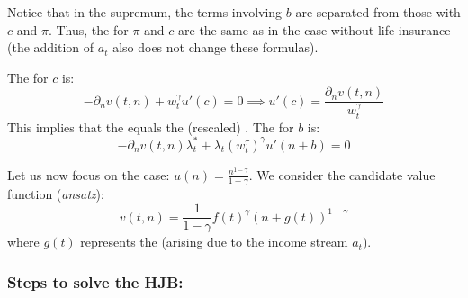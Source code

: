 Notice that in the supremum, the terms involving $b$ are separated from those with $c$ and $\pi$. Thus, the  for $\pi$ and $c$ are the same as in the case without life insurance (the addition of $a_t$ also does not change these formulas).

The  for $c$ is:
\begin{equation*}
    -\partial_n v(t, n) + w_t^\gamma u'(c) = 0 \implies u'(c) = \frac{\partial_n v(t, n)}{w_t^\gamma}
\end{equation*}
This implies that the  equals the (rescaled) . The  for $b$ is:
\begin{equation*}
    -\partial_n v(t, n) \lambda_t^* + \lambda_t (w_t^\tau)^\gamma u'(n + b) = 0
\end{equation*}

Let us now focus on the  case: $u(n) = \frac{n^{1-\gamma}}{1-\gamma}$. We consider the candidate value function (\textit{ansatz}):
\begin{equation*}
    v(t, n) = \frac{1}{1-\gamma} f(t)^\gamma (n + g(t))^{1-\gamma}
\end{equation*}
where $g(t)$ represents the  (arising due to the income stream $a_t$).

\subsubsection*{Steps to solve the HJB:}

